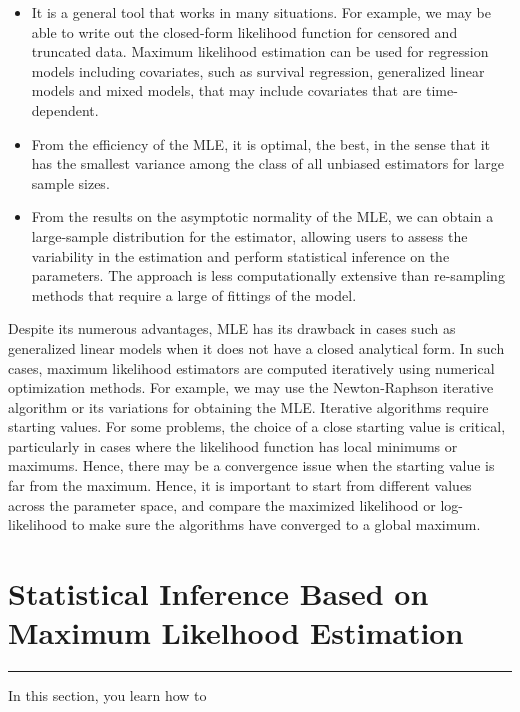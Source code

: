 \documentclass[]{book}
\providecommand{\tightlist}{%
  \setlength{\itemsep}{0pt}\setlength{\parskip}{0pt}}
\theoremstyle{definition}
\theoremstyle{definition}
\theoremstyle{definition}
\theoremstyle{remark}
\begin{document}
\begin{itemize}
\tightlist
\item
  It is a general tool that works in many situations. For example, we
  may be able to write out the closed-form likelihood function for
  censored and truncated data. Maximum likelihood estimation can be used
  for regression models including covariates, such as survival
  regression, generalized linear models and mixed models, that may
  include covariates that are time-dependent.
\item
  From the efficiency of the MLE, it is optimal, the best, in the sense
  that it has the smallest variance among the class of all unbiased
  estimators for large sample sizes.
\item
  From the results on the asymptotic normality of the MLE, we can obtain
  a large-sample distribution for the estimator, allowing users to
  assess the variability in the estimation and perform statistical
  inference on the parameters. The approach is less computationally
  extensive than re-sampling methods that require a large of fittings of
  the model.
\end{itemize}

Despite its numerous advantages, MLE has its drawback in cases such as
generalized linear models when it does not have a closed analytical
form. In such cases, maximum likelihood estimators are computed
iteratively using numerical optimization methods. For example, we may
use the Newton-Raphson iterative algorithm or its variations for
obtaining the MLE. Iterative algorithms require starting values. For
some problems, the choice of a close starting value is critical,
particularly in cases where the likelihood function has local minimums
or maximums. Hence, there may be a convergence issue when the starting
value is far from the maximum. Hence, it is important to start from
different values across the parameter space, and compare the maximized
likelihood or log-likelihood to make sure the algorithms have converged
to a global maximum.

\section{Statistical Inference Based on Maximum Likelhood
Estimation}\label{S:AppC:SI}

\begin{center}\rule{0.5\linewidth}{\linethickness}\end{center}

In this section, you learn how to
\end{document}
